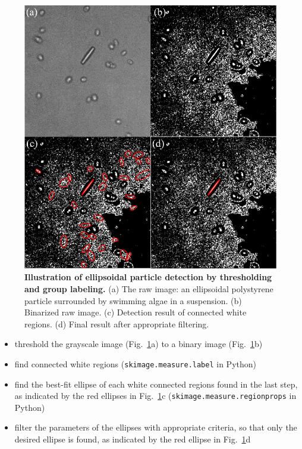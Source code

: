 \begin{figure}[!]
	\begin{center}
	\includegraphics[width=5.5 in]{Figs/2-Exp/5.pdf}
	\end{center}
	\caption[Illustration of ellipsoidal particle detection by thresholding and group labeling]
	{
	\textbf{Illustration of ellipsoidal particle detection by thresholding and group labeling.}
	(a) The raw image: an ellipsoidal polystyrene particle surrounded by swimming algae in a suspension.
	(b) Binarized raw image.
	(c) Detection result of connected white regions.
	(d) Final result after appropriate filtering.
	}
	\label{fig:2-5}
\end{figure}

\begin{itemize}
	\item threshold the grayscale image (Fig.~\ref{fig:2-5}a) to a binary image (Fig.~\ref{fig:2-5}b)
	\item find connected white regions (\texttt{skimage.measure.label} in Python)
	\item find the best-fit ellipse of each white connected regions found in the last step, as indicated by the red ellipses in Fig.~\ref{fig:2-5}c (\texttt{skimage.measure.regionprops} in Python)
	\item filter the parameters of the ellipses with appropriate criteria, so that only the desired ellipse is found, as indicated by the red ellipse in Fig.~\ref{fig:2-5}d
\end{itemize}

